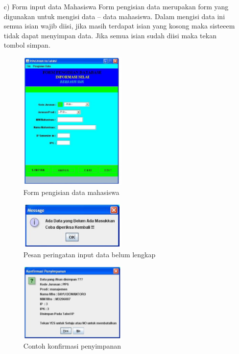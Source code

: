 \documentclass{jtetiproposalskripsi}
\begin{document}
\begin{itemize}
\item[c)]Form input data Mahasiswa
Form pengisian data merupakan form yang digunakan untuk mengisi data – data mahasiswa. Dalam mengisi data ini semua isian wajib diisi, jika masih terdapat isian yang kosong maka sisteeem tidak dapat menyimpan data. Jika semua isian sudah diisi maka tekan tombol simpan.
\begin{figure}[ht!]
  \centering
    \includegraphics[width=0.5\textwidth]{gambar/10}
    \caption{Form pengisian data mahasiswa}
    \label{wsn}
\end{figure}


\begin{figure}[ht!]
  \centering
    \includegraphics[width=0.5\textwidth]{gambar/11}
    \caption{Pesan peringatan input data belum lengkap}
    \label{wsn}
\end{figure}
\newpage

\begin{figure}[ht!]
  \centering
    \includegraphics[width=0.5\textwidth]{gambar/12}
    \caption{Contoh konfirmasi penyimpanan}
    \label{wsn}
\end{figure}


\end{itemize}
\end{document}
